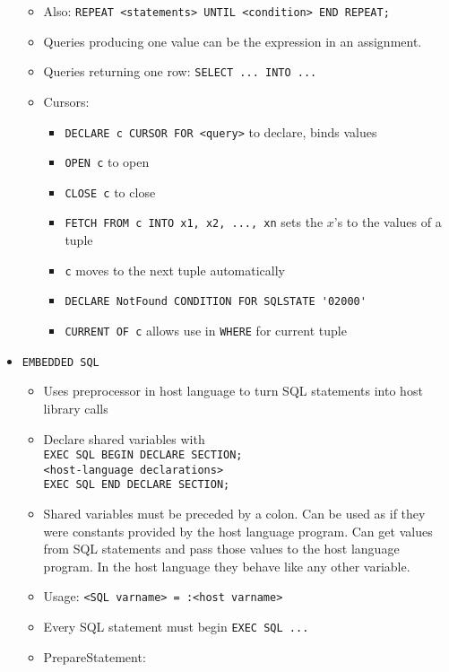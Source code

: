 \documentclass[landscape,8pt]{extarticle}
\newcommand{\code}{\lstinline}
\begin{document}
\begin{multicols}{4}
\begin{itemize}
\begin{itemize}
        \item Also: \code{REPEAT <statements> UNTIL <condition> END REPEAT;}
        \item Queries producing one value can be the expression in an assignment.
        \item Queries returning one row: \code{SELECT ... INTO ...}
        \item Cursors:
        \begin{itemize}
            \item \code{DECLARE c CURSOR FOR <query>} to declare, binds values
            \item \code{OPEN c} to open
            \item \code{CLOSE c} to close
            \item \code{FETCH FROM c INTO x1, x2, ..., xn} sets the $x$'s to the values of a tuple
            \item \code{c} moves to the next tuple automatically
            \item \code{DECLARE NotFound CONDITION FOR SQLSTATE '02000'}
            \item \code{CURRENT OF c} allows use in \code{WHERE} for current tuple
        \end{itemize}
    \end{itemize}
    \item \code{EMBEDDED SQL}
    \begin{itemize}
        \item Uses preprocessor in host language to turn SQL statements into host library calls
        \item Declare shared variables with \\
\code{EXEC SQL BEGIN DECLARE SECTION;}\\
\code{<host-language declarations>}\\
\code{EXEC SQL END DECLARE SECTION;}
        \item Shared variables must be preceded by a colon. Can be used as if they were constants
        provided by the host language program. Can get values from SQL statements and pass those
        values to the host language program. In the host language they behave like any other
        variable.
        \item Usage: \code{<SQL varname> = :<host varname>}
        \item Every SQL statement must begin \code{EXEC SQL ...}
        \item PrepareStatement:\\

\end{itemize}
\end{itemize}
\end{multicols}
\end{document}
